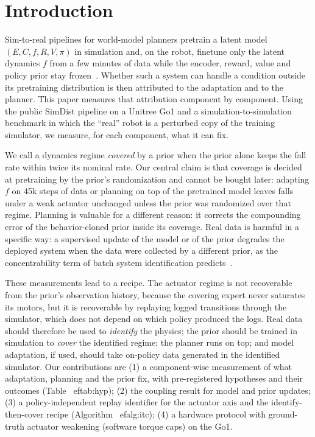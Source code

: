 \documentclass[conference]{IEEEtran}
\begin{document}
\section{Introduction}
Sim-to-real pipelines for world-model planners pretrain a latent model $(E,C,f,R,V,\pi)$ in simulation and, on the robot, finetune only the latent dynamics $f$ from a few minutes of data while the encoder, reward, value and policy prior stay frozen~\cite{levy2026simdist}. Whether such a system can handle a condition outside its pretraining distribution is then attributed to the adaptation and to the planner. This paper measures that attribution component by component. Using the public SimDist pipeline on a Unitree Go1 and a simulation-to-simulation benchmark in which the ``real'' robot is a perturbed copy of the training simulator, we measure, for each component, what it can fix.

We call a dynamics regime \emph{covered} by a prior when the prior alone keeps the fall rate within twice its nominal rate. Our central claim is that coverage is decided at pretraining by the prior's randomization and cannot be bought later: adapting $f$ on 45k steps of data or planning on top of the pretrained model leaves falls under a weak actuator unchanged unless the prior was randomized over that regime. Planning is valuable for a different reason: it corrects the compounding error of the behavior-cloned prior inside its coverage. Real data is harmful in a specific way: a supervised update of the model or of the prior degrades the deployed system when the data were collected by a different prior, as the concentrability term of batch system identification predicts~\cite{ross2012agnostic}.

These measurements lead to a recipe. The actuator regime is not recoverable from the prior's observation history, because the covering expert never saturates its motors, but it is recoverable by replaying logged transitions through the simulator, which does not depend on which policy produced the logs. Real data should therefore be used to \emph{identify} the physics; the prior should be trained in simulation to \emph{cover} the identified regime; the planner runs on top; and model adaptation, if used, should take on-policy data generated in the identified simulator. Our contributions are (1) a component-wise measurement of what adaptation, planning and the prior fix, with pre-registered hypotheses and their outcomes (Table~
ef{tab:hyp}); (2) the coupling result for model and prior updates; (3) a policy-independent replay identifier for the actuator axis and the identify-then-cover recipe (Algorithm~
ef{alg:itc}); (4) a hardware protocol with ground-truth actuator weakening (software torque caps) on the Go1.
\end{document}
